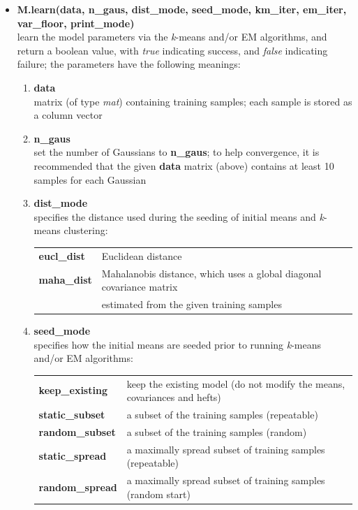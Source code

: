 \begin{small}
\begin{itemize}
\item
{\bf M.learn(data, n\_gaus, dist\_mode, seed\_mode, km\_iter, em\_iter, var\_floor, print\_mode)}\\
learn the model parameters via the {\it k}-means and/or EM algorithms,
and return a boolean value, with {\it true} indicating success, and {\it false} indicating failure;
the parameters have the following meanings:

\begin{enumerate}[{$\cdot$}]
\item
{\bf data}\\
matrix (of type {\it mat}) containing training samples; each sample is stored as a column vector

\item
{\bf n\_gaus}\\
set the number of Gaussians to {\bf n\_gaus};
to help convergence, it is recommended that the given {\bf data} matrix (above)
contains at least 10 samples for each Gaussian

\item
{\bf dist\_mode}\\
specifies the distance used during the seeding of initial means and {\it k}-means clustering:

\begin{tabular}{ll}
{\bf eucl\_dist} & Euclidean distance\\
{\bf maha\_dist} & Mahalanobis distance, which uses a global diagonal covariance matrix\\
                 & estimated from the given training samples
\end{tabular}

\item
{\bf seed\_mode}\\
specifies how the initial means are seeded prior to running {\it k}-means and/or EM algorithms:

\begin{tabular}{ll}
{\bf keep\_existing} & keep the existing model (do not modify the means, covariances and hefts) \\
{\bf static\_subset} & a subset of the training samples (repeatable) \\
{\bf random\_subset} & a subset of the training samples (random) \\
{\bf static\_spread} & a maximally spread subset of training samples (repeatable) \\
{\bf random\_spread} & a maximally spread subset of training samples (random start)
\end{tabular}


\end{enumerate}
\end{itemize}
\end{small}
